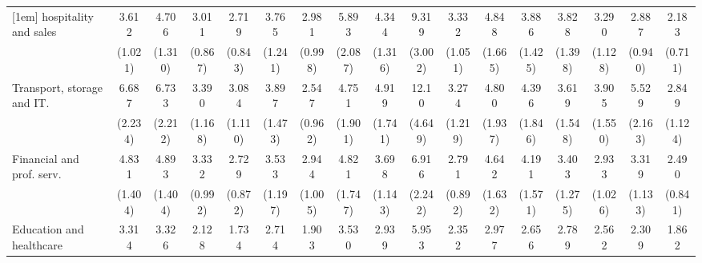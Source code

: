 {\begin{tabular}{l*{16}{c}}
[1em]
hospitality and sales&       3.612\sym{***}&       4.706\sym{***}&       3.011\sym{***}&       2.719\sym{**} &       3.765\sym{***}&       2.981\sym{**} &       5.893\sym{***}&       4.344\sym{***}&       9.319\sym{***}&       3.332\sym{***}&       4.848\sym{***}&       3.886\sym{***}&       3.828\sym{***}&       3.290\sym{***}&       2.887\sym{**} &       2.183\sym{*}  \\
                    &     (1.021)         &     (1.310)         &     (0.867)         &     (0.843)         &     (1.241)         &     (0.998)         &     (2.087)         &     (1.316)         &     (3.002)         &     (1.051)         &     (1.665)         &     (1.425)         &     (1.398)         &     (1.128)         &     (0.940)         &     (0.711)         \\
[1em]
Transport, storage and IT.&       6.687\sym{***}&       6.733\sym{***}&       3.390\sym{***}&       3.084\sym{**} &       3.897\sym{***}&       2.547\sym{*}  &       4.751\sym{***}&       4.919\sym{***}&       12.10\sym{***}&       3.274\sym{**} &       4.800\sym{***}&       4.396\sym{***}&       3.619\sym{**} &       3.905\sym{***}&       5.529\sym{***}&       2.849\sym{**} \\
                    &     (2.234)         &     (2.212)         &     (1.168)         &     (1.110)         &     (1.473)         &     (0.962)         &     (1.901)         &     (1.741)         &     (4.649)         &     (1.219)         &     (1.937)         &     (1.846)         &     (1.548)         &     (1.550)         &     (2.163)         &     (1.124)         \\
[1em]
Financial and prof. serv.&       4.831\sym{***}&       4.893\sym{***}&       3.332\sym{***}&       2.729\sym{**} &       3.533\sym{***}&       2.944\sym{**} &       4.821\sym{***}&       3.698\sym{***}&       6.916\sym{***}&       2.791\sym{**} &       4.642\sym{***}&       4.191\sym{***}&       3.403\sym{**} &       2.933\sym{**} &       3.319\sym{***}&       2.490\sym{**} \\
                    &     (1.404)         &     (1.404)         &     (0.992)         &     (0.872)         &     (1.197)         &     (1.005)         &     (1.747)         &     (1.143)         &     (2.242)         &     (0.892)         &     (1.632)         &     (1.571)         &     (1.275)         &     (1.026)         &     (1.133)         &     (0.841)         \\
[1em]
Education and healthcare&       3.314\sym{***}&       3.326\sym{***}&       2.128\sym{*}  &       1.734         &       2.714\sym{**} &       1.903         &       3.530\sym{***}&       2.939\sym{***}&       5.953\sym{***}&       2.352\sym{**} &       2.977\sym{**} &       2.656\sym{**} &       2.789\sym{**} &       2.562\sym{**} &       2.309\sym{*}  &       1.862         \\

\end{tabular}}
